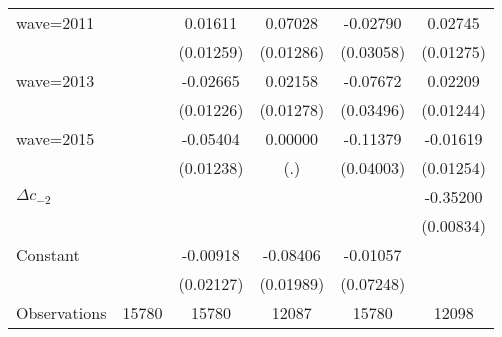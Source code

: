 {\begin{longtable}{l*{5}{c}}
\addlinespace
wave=2011           &                     &     0.01611         &     0.07028\sym{***}&    -0.02790         &     0.02745\sym{**} \\
                    &                     &   (0.01259)         &   (0.01286)         &   (0.03058)         &   (0.01275)         \\
\addlinespace
wave=2013           &                     &    -0.02665\sym{**} &     0.02158\sym{*}  &    -0.07672\sym{**} &     0.02209\sym{*}  \\
                    &                     &   (0.01226)         &   (0.01278)         &   (0.03496)         &   (0.01244)         \\
\addlinespace
wave=2015           &                     &    -0.05404\sym{***}&     0.00000         &    -0.11379\sym{***}&    -0.01619         \\
                    &                     &   (0.01238)         &         (.)         &   (0.04003)         &   (0.01254)         \\
\addlinespace
$\Delta c_{-2}$     &                     &                     &                     &                     &    -0.35200\sym{***}\\
                    &                     &                     &                     &                     &   (0.00834)         \\
\addlinespace
Constant            &                     &    -0.00918         &    -0.08406\sym{***}&    -0.01057         &                     \\
                    &                     &   (0.02127)         &   (0.01989)         &   (0.07248)         &                     \\
\midrule
Observations        &       15780         &       15780         &       12087         &       15780         &       12098         \\
\bottomrule
\end{longtable}
}
